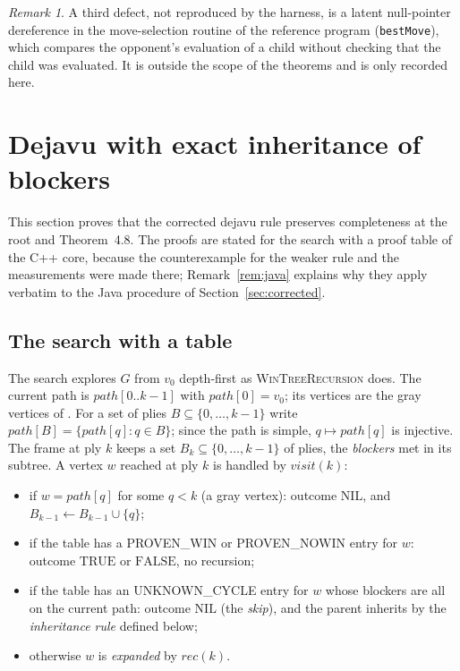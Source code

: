 \documentclass{article}
\theoremstyle{plain}
\theoremstyle{definition}
\theoremstyle{remark}
\newtheorem{remark}[theorem]{Remark}
\newcommand{\TRUE}{\ensuremath{\mathrm{TRUE}}}
\newcommand{\FALSE}{\ensuremath{\mathrm{FALSE}}}
\newcommand{\NIL}{\ensuremath{\mathrm{NIL}}}
\newcommand{\PW}{\textsf{PROVEN\_WIN}}
\newcommand{\PN}{\textsf{PROVEN\_NOWIN}}
\newcommand{\UC}{\textsf{UNKNOWN\_CYCLE}}
\newcommand{\code}[1]{\texttt{#1}}
\newcommand{\WTR}{\textsc{WinTreeRecursion}}
\begin{document}
\begin{remark}
A third defect, not reproduced by the harness, is a latent null-pointer dereference in the move-selection routine of the reference program (\code{bestMove}), which compares the opponent's evaluation of a child without checking that the child was evaluated. It is outside the scope of the theorems and is only recorded here.
\end{remark}

\section{Dejavu with exact inheritance of blockers}\label{sec:lemma}

This section proves that the corrected dejavu rule preserves completeness at the root and Theorem~4.8. The proofs are stated for the search with a proof table of the C++ core, because the counterexample for the weaker rule and the measurements were made there; Remark~\ref{rem:java} explains why they apply verbatim to the Java procedure of Section~\ref{sec:corrected}.

\subsection{The search with a table}\label{sec:search}

The search explores $G$ from $v_0$ depth-first as \WTR{} does. The current path is $\mathit{path}[0..k-1]$ with $\mathit{path}[0] = v_0$; its vertices are the gray vertices of \cite{romano2026}. For a set of plies $B \subseteq \{0, \dots, k-1\}$ write $\mathit{path}[B] = \{\mathit{path}[q] : q \in B\}$; since the path is simple, $q \mapsto \mathit{path}[q]$ is injective. The frame at ply $k$ keeps a set $B_k \subseteq \{0, \dots, k-1\}$ of plies, the \emph{blockers} met in its subtree. A vertex $w$ reached at ply $k$ is handled by $\mathit{visit}(k)$:

\begin{itemize}[leftmargin=*]
\item[(V1)] if $w = \mathit{path}[q]$ for some $q < k$ (a gray vertex): outcome \NIL{}, and $B_{k-1} \gets B_{k-1} \cup \{q\}$;
\item[(V2)] if the table has a \PW{} or \PN{} entry for $w$: outcome \TRUE{} or \FALSE{}, no recursion;
\item[(V3)] if the table has an \UC{} entry for $w$ whose blockers are all on the current path: outcome \NIL{} (the \emph{skip}), and the parent inherits by the \emph{inheritance rule} defined below;
\item[(V4)] otherwise $w$ is \emph{expanded} by $\mathit{rec}(k)$.
\end{itemize}
\end{document}

